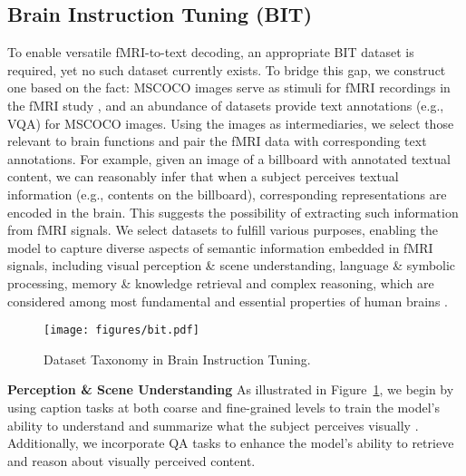 \subsection{Brain Instruction Tuning (BIT)}
To enable versatile fMRI-to-text decoding, an appropriate BIT dataset is required, yet no such dataset currently exists. To bridge this gap, we construct one based on the fact: MSCOCO images \cite{chen2015microsoft} serve as stimuli for fMRI recordings in the fMRI study \cite{allen2022massive}, and an abundance of datasets provide text annotations (e.g., VQA) for MSCOCO images. Using the images as intermediaries, we select those relevant to brain functions and pair the fMRI data with corresponding text annotations. For example, given an image of a billboard with annotated textual content, we can reasonably infer that when a subject perceives textual information (e.g., contents on the billboard), corresponding representations are encoded in the brain. This suggests the possibility of extracting such information from fMRI signals. We select datasets to fulfill various purposes, enabling the model to capture diverse aspects of semantic information embedded in fMRI signals, including visual perception \& scene understanding, language \& symbolic processing, memory \& knowledge retrieval and complex reasoning, which are considered among most fundamental and essential properties of human brains \cite{robertson2002memory,stenning2012human,wade2013visual,friederici2017language}.

\begin{figure}[h]
    \centering
    \texttt{[image: figures/bit.pdf]}
\vspace{-1.8em}
    \caption{Dataset Taxonomy in Brain Instruction Tuning.}
    \label{fig:bit}
\end{figure}

\noindent\textbf{Perception \& Scene Understanding} As illustrated in Figure~\ref{fig:bit}, we begin by using caption tasks at both coarse and fine-grained levels to train the model’s ability to understand and summarize what the subject perceives visually \cite{chen2015microsoft,krause2017hierarchical}. Additionally, we incorporate QA tasks \cite{ren2015exploring,krishna2017visual,acharya2019tallyqa} to enhance the model's ability to retrieve and reason about visually perceived content.


